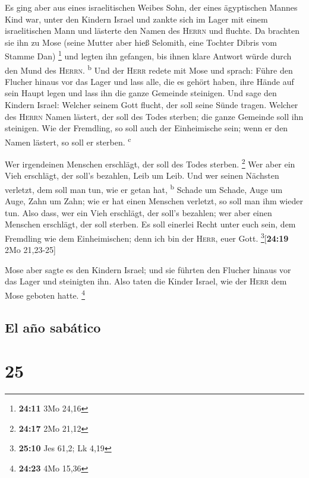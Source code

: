  Es ging aber aus eines israelitischen Weibes Sohn, der
eines ägyptischen Mannes Kind war, unter den Kindern Israel und zankte
sich im Lager mit einem israelitischen Mann  und lästerte
den Namen des \textsc{Herrn} und fluchte. Da brachten sie ihn zu Mose
(seine Mutter aber hieß Selomith, eine Tochter Dibris vom Stamme Dan)
\footnote{\textbf{24:11} 3Mo 24,16}  und legten ihn
gefangen, bis ihnen klare Antwort würde durch den Mund des
\textsc{Herrn}. \textsuperscript{b}  Und der
\textsc{Herr} redete mit Mose und sprach:  Führe den
Flucher hinaus vor das Lager und lass alle, die es gehört haben, ihre
Hände auf sein Haupt legen und lass ihn die ganze Gemeinde steinigen.
 Und sage den Kindern Israel: Welcher seinem Gott flucht,
der soll seine Sünde tragen.  Welcher des \textsc{Herrn}
Namen lästert, der soll des Todes sterben; die ganze Gemeinde soll ihn
steinigen. Wie der Fremdling, so soll auch der Einheimische sein; wenn
er den Namen lästert, so soll er sterben. \textsuperscript{c}

 Wer irgendeinen Menschen erschlägt, der soll des Todes
sterben. \footnote{\textbf{24:17} 2Mo 21,12}  Wer aber
ein Vieh erschlägt, der soll's bezahlen, Leib um Leib. 
Und wer seinen Nächsten verletzt, dem soll man tun, wie er getan hat,
\textsuperscript{b}  Schade um Schade, Auge um Auge, Zahn
um Zahn; wie er hat einen Menschen verletzt, so soll man ihm wieder tun.
 Also dass, wer ein Vieh erschlägt, der soll's bezahlen;
wer aber einen Menschen erschlägt, der soll sterben.  Es
soll einerlei Recht unter euch sein, dem Fremdling wie dem
Einheimischen; denn ich bin der \textsc{Herr}, euer Gott.
\footnote{\textbf{25:10} Jes 61,2; Lk 4,19}{[}\textbf{24:19} 2Mo
21,23-25{]}

 Mose aber sagte es den Kindern Israel; und sie führten
den Flucher hinaus vor das Lager und steinigten ihn. Also taten die
Kinder Israel, wie der \textsc{Herr} dem Mose geboten hatte. \footnote{\textbf{24:23}
  4Mo 15,36}

\hypertarget{el-auxf1o-sabuxe1tico}{%
\subsection{El año sabático}\label{el-auxf1o-sabuxe1tico}}

\hypertarget{section-24}{%
\section{25}\label{section-24}}

